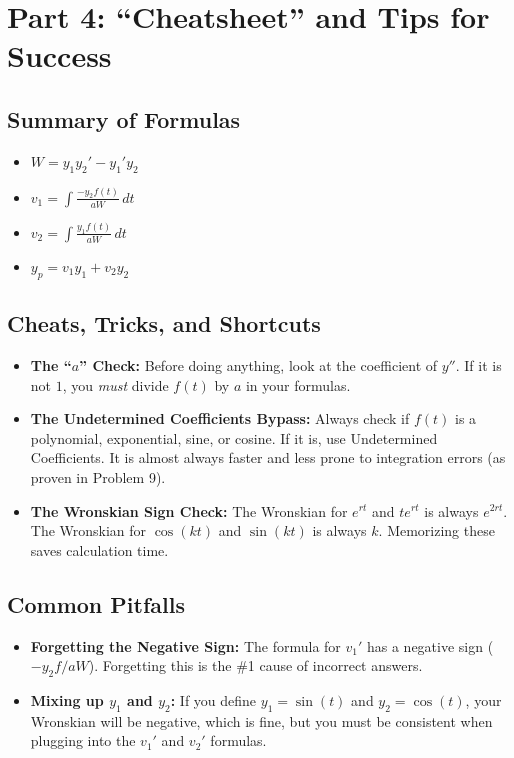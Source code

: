 \documentclass{article}
\begin{document}
\section{Part 4: ``Cheatsheet'' and Tips for Success}
\subsection{Summary of Formulas}
\begin{itemize}
    \item $W = y_1 y_2' - y_1' y_2$
    \item $v_1 = \int \frac{-y_2 f(t)}{a W} \, dt$
    \item $v_2 = \int \frac{y_1 f(t)}{a W} \, dt$
    \item $y_p = v_1 y_1 + v_2 y_2$
\end{itemize}

\subsection{Cheats, Tricks, and Shortcuts}
\begin{itemize}
    \item \textbf{The ``$a$'' Check:} Before doing anything, look at the coefficient of $y''$. If it is not $1$, you \textit{must} divide $f(t)$ by $a$ in your formulas.
    \item \textbf{The Undetermined Coefficients Bypass:} Always check if $f(t)$ is a polynomial, exponential, sine, or cosine. If it is, use Undetermined Coefficients. It is almost always faster and less prone to integration errors (as proven in Problem 9).
    \item \textbf{The Wronskian Sign Check:} The Wronskian for $e^{rt}$ and $t e^{rt}$ is always $e^{2rt}$. The Wronskian for $\cos(kt)$ and $\sin(kt)$ is always $k$. Memorizing these saves calculation time.
\end{itemize}

\subsection{Common Pitfalls}
\begin{itemize}
    \item \textbf{Forgetting the Negative Sign:} The formula for $v_1'$ has a negative sign ($-y_2 f / aW$). Forgetting this is the \#1 cause of incorrect answers.
    \item \textbf{Mixing up $y_1$ and $y_2$:} If you define $y_1 = \sin(t)$ and $y_2 = \cos(t)$, your Wronskian will be negative, which is fine, but you must be consistent when plugging into the $v_1'$ and $v_2'$ formulas.
\end{itemize}
\end{document}
